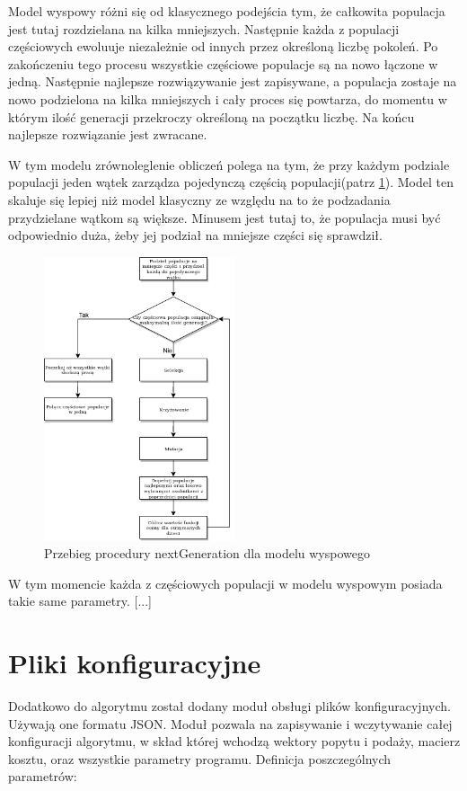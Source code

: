 Model wyspowy różni się od klasycznego podejścia tym, że całkowita populacja jest tutaj rozdzielana na kilka mniejszych. Następnie każda z 
populacji częściowych ewoluuje niezależnie od innych przez określoną liczbę pokoleń. Po zakończeniu tego procesu wszystkie częściowe populacje 
są na nowo łączone w jedną. Następnie najlepsze rozwiązywanie jest zapisywane, a populacja zostaje na nowo podzielona na kilka mniejszych i 
cały proces się powtarza, do momentu w którym ilość generacji przekroczy określoną na początku liczbę. Na końcu najlepsze rozwiązanie jest zwracane.

W tym modelu zrównoleglenie obliczeń polega na tym, że przy każdym podziale populacji jeden wątek zarządza pojedynczą częścią populacji(patrz \ref{next_gen_wyspowy_img}).
Model ten skaluje się lepiej niż model klasyczny ze względu na to że podzadania przydzielane wątkom są większe. Minusem jest tutaj to, że populacja 
musi być odpowiednio duża, żeby jej podział na mniejsze części się sprawdził.

\begin{figure}[H]
    \centering        
    \includegraphics[width=0.5\textwidth]{img/next_gen_wyspowy.png}
    \caption{Przebieg procedury nextGeneration dla modelu wyspowego}
    \label{next_gen_wyspowy_img}
\end{figure}

W tym momencie każda z częściowych populacji w modelu wyspowym posiada takie same parametry. [...]

\section{Pliki konfiguracyjne}
Dodatkowo do algorytmu został dodany moduł obsługi plików konfiguracyjnych. Używają one formatu JSON. Moduł pozwala na zapisywanie i wczytywanie 
całej konfiguracji algorytmu, w skład której wchodzą wektory popytu i podaży, macierz kosztu, oraz wszystkie parametry programu.
Definicja poszczególnych parametrów:

